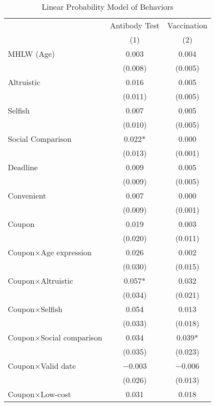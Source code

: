 \begin{table}

\caption{Linear Probability Model of Behaviors \label{tab:act-reg}}
\centering
\fontsize{9}{11}\selectfont
\begin{threeparttable}
\begin{tabular}[t]{lcc}
\toprule
\multicolumn{1}{c}{ } & \multicolumn{1}{c}{Antibody Test} & \multicolumn{1}{c}{Vaccination} \\
\cmidrule(l{3pt}r{3pt}){2-2} \cmidrule(l{3pt}r{3pt}){3-3}
  & (1) & (2)\\
\midrule
MHLW (Age) & \num{0.003} & \num{0.004}\\
 & (\num{0.008}) & (\num{0.005})\\
Altruistic & \num{0.016} & \num{0.005}\\
 & (\num{0.011}) & (\num{0.005})\\
Selfish & \num{0.007} & \num{0.005}\\
 & (\num{0.010}) & (\num{0.005})\\
Social Comparison & \num{0.022}* & \num{0.000}\\
 & (\num{0.013}) & (\num{0.001})\\
Deadline & \num{0.009} & \num{0.005}\\
 & (\num{0.009}) & (\num{0.005})\\
Convenient & \num{0.007} & \num{0.000}\\
 & (\num{0.009}) & (\num{0.001})\\
Coupon & \num{0.019} & \num{0.003}\\
 & (\num{0.020}) & (\num{0.011})\\
Coupon×Age expression & \num{0.026} & \num{0.002}\\
 & (\num{0.030}) & (\num{0.015})\\
Coupon×Altruistic & \num{0.057}* & \num{0.032}\\
 & (\num{0.034}) & (\num{0.021})\\
Coupon×Selfish & \num{0.054} & \num{0.013}\\
 & (\num{0.033}) & (\num{0.018})\\
Coupon×Social comparison & \num{0.034} & \num{0.039}*\\
 & (\num{0.035}) & (\num{0.023})\\
Coupon×Valid date & \num{-0.003} & \num{-0.006}\\
 & (\num{0.026}) & (\num{0.013})\\
Coupon×Low-cost & \num{0.031} & \num{0.018}\\

\end{tabular}
\end{threeparttable}
\end{table}
